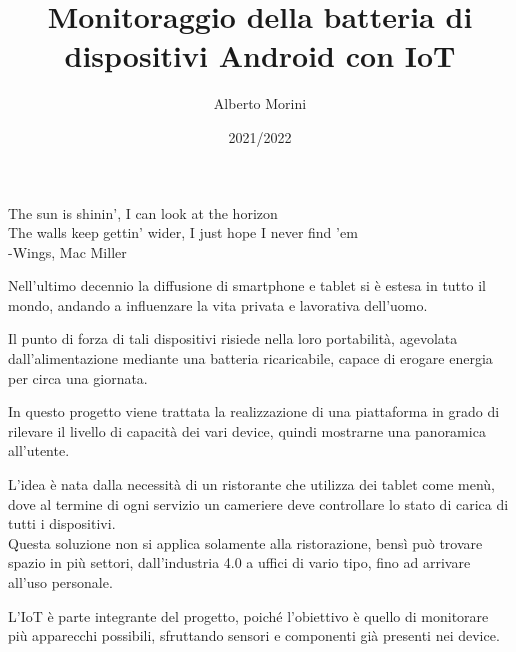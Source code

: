 \documentclass[target=bach]{thud}
\title{Monitoraggio della batteria di dispositivi Android con IoT}
\author{Alberto Morini}
\date{2021/2022}
\begin{document}
\maketitle

\begin{dedication}
	The sun is shinin', I can look at the horizon\\
	The walls keep gettin' wider, I just hope I never find 'em\\
	-Wings, Mac Miller
\end{dedication}


\abstract

    Nell'ultimo decennio la diffusione di smartphone e tablet si è estesa in tutto il mondo, andando a influenzare la vita privata e lavorativa dell'uomo.\

    Il punto di forza di tali dispositivi risiede nella loro portabilità, agevolata dall'alimentazione mediante una batteria ricaricabile, capace di erogare energia per circa una giornata.\

    In questo progetto viene trattata la realizzazione di una piattaforma in grado di rilevare il livello di capacità dei vari device, quindi mostrarne una panoramica all'utente.\

    L'idea è nata dalla necessità di un ristorante che utilizza dei tablet come menù, dove al termine di ogni servizio un cameriere deve controllare lo stato di carica di tutti i dispositivi.\\
    Questa soluzione non si applica solamente alla ristorazione, bensì può trovare spazio in più settori, dall'industria 4.0 a uffici di vario tipo, fino ad arrivare all'uso personale. \

    L'IoT è parte integrante del progetto, poiché l'obiettivo è quello di monitorare più apparecchi possibili, sfruttando sensori e componenti già presenti nei device.


\tableofcontents


\listoffigures

\mainmatter

\end{document}
